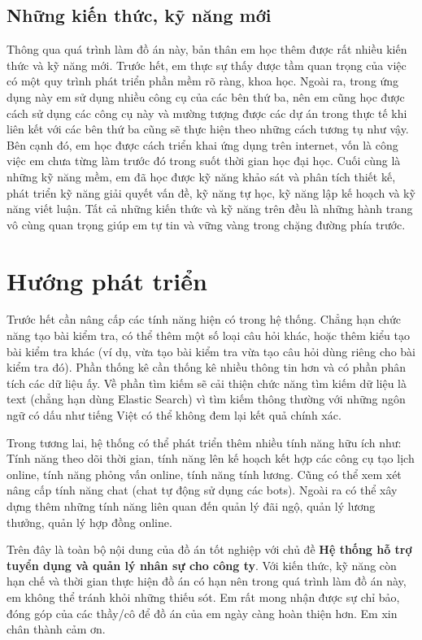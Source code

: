 \documentclass[../DoAn.tex]{subfiles}
\begin{document}
\subsection{Những kiến thức, kỹ năng mới}
Thông qua quá trình làm đồ án này, bản thân em học thêm được rất nhiều kiến thức và kỹ năng mới. Trước hết, em thực sự thấy được tầm quan trọng của việc có một quy trình phát triển phần mềm rõ ràng, khoa học. Ngoài ra, trong ứng dụng này em sử dụng nhiều công cụ của các bên thứ ba, nên em cũng học được cách sử dụng các công cụ này và mường tượng được các dự án trong thực tế khi liên kết với các bên thứ ba cũng sẽ thực hiện theo những cách tương tụ như vậy. Bên cạnh đó, em học được cách triển khai ứng dụng trên internet, vốn là công việc em chưa từng làm trước đó trong suốt thời gian học đại học. Cuối cùng là những kỹ năng mềm, em đã học được kỹ năng khảo sát và phân tích thiết kế, phát triển kỹ năng giải quyết vấn đề, kỹ năng tự học, kỹ năng lập kế hoạch và kỹ năng viết luận. Tất cả những kiến thức và kỹ năng trên đều là những hành trang vô cùng quan trọng giúp em tự tin và vững vàng trong chặng đường phía trước.

\section{Hướng phát triển}
Trước hết cần nâng cấp các tính năng hiện có trong hệ thống. Chẳng hạn chức năng tạo bài kiểm tra, có thể thêm một số loại câu hỏi khác, hoặc thêm kiểu tạo bài kiểm tra khác (ví dụ, vừa tạo bài kiểm tra vừa tạo câu hỏi dùng riêng cho bài kiểm tra đó). Phần thống kê cần thống kê nhiều thông tin hơn và có phần phân tích các dữ liệu ấy. Về phần tìm kiếm sẽ cải thiện chức năng tìm kiếm dữ liệu là text (chẳng hạn dùng Elastic Search) vì tìm kiếm thông thường với những ngôn ngữ có dấu như tiếng Việt có thể không đem lại kết quả chính xác.

Trong tương lai, hệ thống có thể phát triển thêm nhiều tính năng hữu ích như: Tính năng theo dõi thời gian, tính năng lên kế hoạch kết hợp các công cụ tạo lịch online, tính năng phỏng vấn online, tính năng tính lương. Cũng có thể xem xét nâng cấp tính năng chat (chat tự động sử dụng các bots). Ngoài ra có thể xây dựng thêm những tính năng liên quan đến quản lý đãi ngộ, quản lý lương thưởng, quản lý hợp đồng online.

Trên đây là toàn bộ nội dung của đồ án tốt nghiệp với chủ đề \textbf{Hệ thống hỗ trợ tuyển dụng và quản lý nhân sự cho công ty}. Với kiến thức, kỹ năng còn hạn chế và thời gian thực hiện đồ án có hạn nên trong quá trình làm đồ án này, em không thể tránh khỏi những thiếu sót. Em rất mong nhận được sự chỉ bảo, đóng góp của các thầy/cô để đồ án của em ngày càng hoàn thiện hơn. Em xin chân thành cảm ơn.
\end{document}
